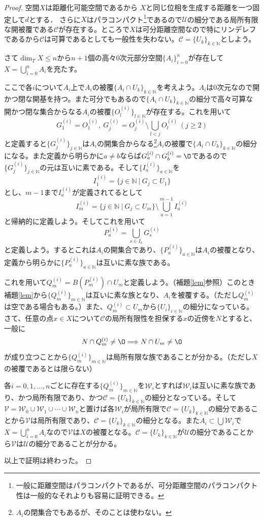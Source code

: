 \documentclass[leqno, a4paper, 12pt]{jsarticle}
\newcommand{\To}{\Longrightarrow}
\newcommand{\nn}{\mathbb{N}}
\newcommand{\dpst}{\displaystyle}
\begin{document}
\begin{proof}
空間$X$は距離化可能空間であるから
$X$と同じ位相を生成する距離を一つ固定して$d$とする．
さらに$X$はパラコンパクト\footnote{一般に距離空間はパラコンパクトであるが、可分距離空間のパラコンパクト性は一般的なそれよりも容易に証明できる。}であるので$\mathcal{U}$の細分である局所有限な開被覆である$\mathcal{C}$が存在する。ところで$X$は可分距離空間なので特にリンデレフであるから$\mathcal{C}$は可算であるとしても一般性を失わない。$\mathcal{C}=\{U_k\}_{k\in \nn}$としよう。\par
さて$\dim_{T}X\le n$から$n+1$個の高々$0$次元部分空間$\{A_i\}_{i=0}^n$が存在して$\dpst X=\bigcup_{i=0}^nA_i$を充たす。\par
ここで各$i$について$A_i$上で$A_i$の被覆$\{A_i\cap U_k\}_{k\in \nn}$を考えよう。$A_i$は$0$次元なので開かつ閉な開基を持つ。また可分でもあるので$\{A_i\cap U_k\}_{k\in \nn}$の細分で高々可算な開かつ閉な集合からなる$A_i$の被覆$\{O_l^{(i)}\}_{l\in \nn}$が存在する。これを用いて
\[
G_1^{(i)}=O_1^{(i)},\ G_j^{(i)}=O_j^{(i)}\setminus \bigcup_{l<j}O_l^{(i)}\ (j\ge 2)
\]
と定義すると$\{G_j^{(i)}\}_{j\in \nn}$は$A_i$の開集合からなる\footnote{$A_i$の閉集合でもあるが、そのことは使わない。}$A_i$の被覆で$\{A_i\cap U_k\}_{k\in \nn}$の細分になる。また定義から明らかに$a\neq b$ならば$G_a^{(i)}\cap G_b^{(i)}=\O$であるので$\{G_j^{(i)}\}_{j\in \nn}$の元は互いに素である。そして$\{I_a^{(i)}\}_{a\in \nn}$を
\[
I_{1}^{(i)}=\{j\in \nn\ |\ G_j\subset U_1\}
\]
とし、$m-1$まで$I_a^{(i)}$が定義されてるとして
\[
I_m^{(i)}=\{j\in\nn\ |\ G_j\subset U_m\}\setminus \bigcup_{a=1}^{m-1}I_{a}^{(i)}
\]
と帰納的に定義しよう。そしてこれを用いて
\[
P_a^{(i)}=\bigcup_{s\in I_a}G_s^{(i)}
\]
と定義しよう。するとこれは$A_i$の開集合であり、$\{P_a^{(i)}\}_{a\in \nn}$は$A_i$の被覆となり、定義から明らかに$\{P_a^{(i)}\}_{a\in \nn}$は互いに素な族である。\par
これを用いて$Q_m^{(i)}=B(P_m^{(i)})\cap U_m$と定義しよう。（補題\ref{lem}参照）このとき補題\ref{lem}から$\{Q_m^{(i)}\}_{m\in \nn}$は互いに素な族となり、$A_i$を被覆する。（ただし$Q_m^{(i)}$は空である場合もある。）また、$Q_m^{(i)}\subset U_m$から$\{U_i\}_{i\in \nn}$の細分になっている。さて、任意の点$x\in X$について$\mathcal{C}$の局所有限性を担保する$x$の近傍を$N$とすると、一般に
\[
N\cap Q_m^{(i)}\neq\O\To N\cap U_m\neq\O
\]
が成り立つことから$\{Q_m^{(i)}\}_{m\in \nn}$は局所有限な族であることが分かる。（ただし$X$の被覆であるとは限らない）\par
各$i=0,1,\dots ,n$ごとに存在する$\{Q_m^{(i)}\}_{m\in \nn}$を$\mathcal{W}_{i}$とすれば$\mathcal{W}_i$は互いに素な族であり、かつ局所有限であり、かつ$\mathcal{C}=\{U_k\}_{k\in \nn}$の細分となっている。そして$\mathcal{V}=\mathcal{W}_0\cup\mathcal{W}_1\cup\cdots\cup\mathcal{W}_n$と置けば各$\mathcal{W}_i$が局所有限で$\mathcal{C}=\{U_k\}_{k\in \nn}$の細分であることから$\mathcal{V}$は局所有限であり、$\mathcal{C}=\{U_k\}_{k\in \nn}$の細分となる。また$A_i\subset \bigcup\mathcal{W}_i$で$\dpst X=\bigcup_{i=0}^nA_i$なので$\mathcal{V}$は$X$の被覆となる。$\mathcal{C}=\{U_k\}_{k\in \nn}$が$\mathcal{U}$の細分であることから$\mathcal{V}$は$\mathcal{U}$の細分であることが分かる。\par
以上で証明は終わった。
\end{proof}
\end{document}
